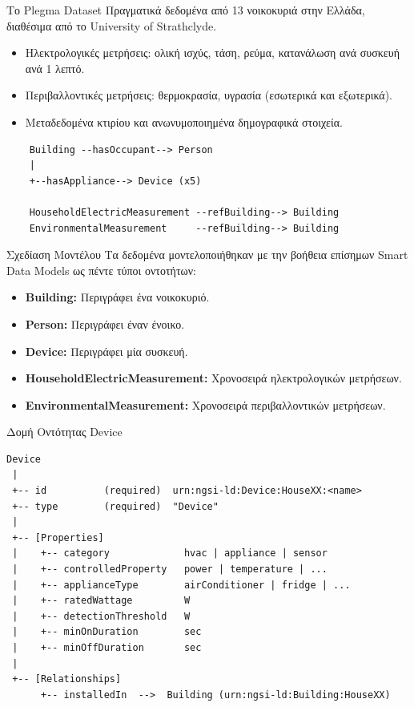 \documentclass[11pt]{beamer}
\newcommand{\en}[1]{\foreignlanguage{english}{#1}}
\begin{document}
\begin{frame}[fragile]{Το \en{Plegma Dataset}}
Πραγματικά δεδομένα από 13 νοικοκυριά στην Ελλάδα, διαθέσιμα από
το \en{University of Strathclyde}.

\begin{itemize}
    \item Ηλεκτρολογικές μετρήσεις: ολική ισχύς, τάση, ρεύμα,
    κατανάλωση ανά συσκευή ανά 1 λεπτό.
    \item Περιβαλλοντικές μετρήσεις: θερμοκρασία, υγρασία
    (εσωτερικά και εξωτερικά).
    \item Μεταδεδομένα κτιρίου και ανωνυμοποιημένα δημογραφικά
    στοιχεία.
\end{itemize}
\bigskip

\begin{lstlisting}
    Building --hasOccupant--> Person
    |
    +--hasAppliance--> Device (x5)

    HouseholdElectricMeasurement --refBuilding--> Building
    EnvironmentalMeasurement     --refBuilding--> Building
\end{lstlisting}
\end{frame}

\begin{frame}[fragile]{Σχεδίαση Μοντέλου}
Τα δεδομένα μοντελοποιήθηκαν με την βοήθεια επίσημων \en{Smart Data Models} 
ως πέντε τύποι οντοτήτων:
\bigskip 

\begin{itemize}
    \item \textbf{\textlatin{Building:}} Περιγράφει ένα νοικοκυριό.
    \item \textbf{\textlatin{Person:}} Περιγράφει έναν ένοικο.
    \item \textbf{\textlatin{Device:}} Περιγράφει μία συσκευή.
    \item \textbf{\textlatin{HouseholdElectricMeasurement:}} Χρονοσειρά ηλεκτρολογικών μετρήσεων.
    \item \textbf{\textlatin{EnvironmentalMeasurement:}} Χρονοσειρά περιβαλλοντικών μετρήσεων.
\end{itemize}
\end{frame}

\begin{frame}[fragile]{Δομή Οντότητας \en{Device}}
\begin{lstlisting}
Device
 |
 +-- id          (required)  urn:ngsi-ld:Device:HouseXX:<name>
 +-- type        (required)  "Device"
 |
 +-- [Properties]
 |    +-- category             hvac | appliance | sensor
 |    +-- controlledProperty   power | temperature | ...
 |    +-- applianceType        airConditioner | fridge | ...
 |    +-- ratedWattage         W  
 |    +-- detectionThreshold   W  
 |    +-- minOnDuration        sec
 |    +-- minOffDuration       sec
 |
 +-- [Relationships]
      +-- installedIn  -->  Building (urn:ngsi-ld:Building:HouseXX)
\end{lstlisting}
\end{frame}
\end{document}
